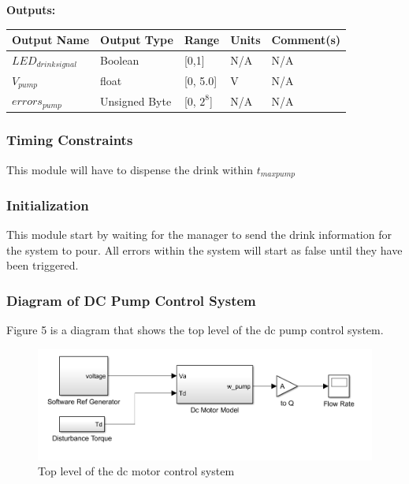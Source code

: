 \documentclass [10pt]{article}
\begin{document}
\textbf{Outputs: } \\

\begin{longtable}{|l|l|l|l|l|}\hline 
	\rowcolor{tableCell}\textbf{Output Name} & \textbf{Output Type} & \textbf{Range} & \textbf{Units} & \textbf{Comment(s)} \\ \hline
	$ LED_{drinksignal} $ & Boolean & [0,1] & N/A &  N/A\\ \hline
	\rowcolor{tableCell}$ V_{pump } $ & float & [0, 5.0]& V & N/A\\ \hline
	$  errors_{pump} $ & Unsigned Byte & [0, $2^{8}$]& N/A & N/A\\ \hline
\end{longtable}



\subsubsection{Timing Constraints}
This module will have to dispense the drink within $ t_{maxpump} $


\subsubsection{Initialization}
This module start by waiting for the manager to send the drink information for the system to pour. All errors within the system will start as false until they have been triggered.



\subsubsection{Diagram of DC Pump Control System}
Figure 5 is a diagram that shows the top level of the dc pump control system. 
\begin{figure} [h!]
	\centering
	\includegraphics [scale = 0.6] {Figures/DC_PumpSim.png}
	\caption{Top level of the dc motor control system}
\end{figure}
\end{document}
